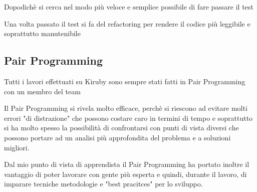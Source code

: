 Dopodichè si cerca nel modo più veloce e semplice possibile di fare passare il test

Una volta passato il test si fa del refactoring per rendere il codice più leggibile
e soprattutto manutenibile

\subsection{Pair Programming}
Tutti i lavori effettuati su Kiruby sono sempre stati fatti in Pair Programming
con un membro del team

Il Pair Programming si rivela molto efficace, perchè si riescono ad evitare molti
errori "di distrazione" che possono costare caro in termini di tempo e soprattutto
si ha molto spesso la possibilità di confrontarsi con punti di vista diversi che possono
portare ad un analisi più approfondita del problema e a soluzioni migliori. 

Dal mio punto di vista di apprendista il Pair Programming ha portato inoltre il vantaggio
di poter lavorare con gente più esperta e quindi, durante il lavoro, di imparare tecniche 
metodologie e "best pracitces" per lo sviluppo.
